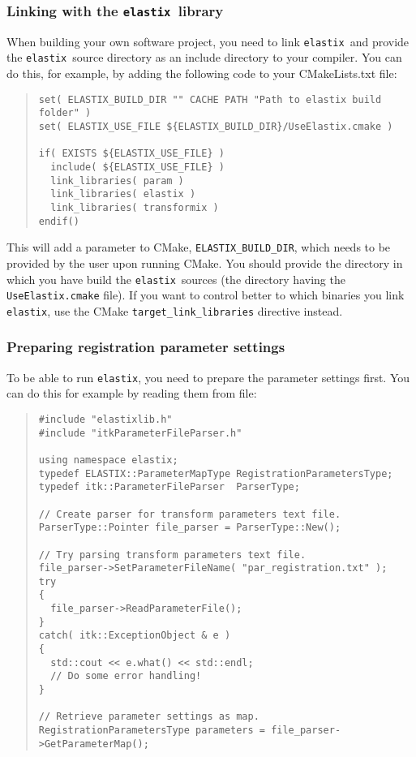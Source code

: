 \documentclass[]{report}
\newcommand{\elastix}{\texttt{elastix}}
\begin{document}
\subsubsection{Linking with the \elastix\ library}

When building your own software project, you need to link \elastix\
and provide the \elastix\ source directory as an include directory
to your compiler. You can do this, for example, by adding the
following code to your CMakeLists.txt file:
\begin{quote}
\begin{verbatim}
set( ELASTIX_BUILD_DIR "" CACHE PATH "Path to elastix build folder" )
set( ELASTIX_USE_FILE ${ELASTIX_BUILD_DIR}/UseElastix.cmake )

if( EXISTS ${ELASTIX_USE_FILE} )
  include( ${ELASTIX_USE_FILE} )
  link_libraries( param )
  link_libraries( elastix )
  link_libraries( transformix )
endif()
\end{verbatim}
\end{quote}

This will add a parameter to CMake, \texttt{ELASTIX\_BUILD\_DIR},
which needs to be provided by the user upon running CMake. You
should provide the directory in which you have build the \elastix\
sources (the directory having the \texttt{UseElastix.cmake} file).
If you want to control better to which binaries you link \elastix,
use the CMake \texttt{target\_link\_libraries} directive instead.


\subsubsection{Preparing registration parameter settings}

To be able to run \elastix, you need to prepare the parameter
settings first. You can do this for example by reading them from
file:
\begin{quote}
\begin{verbatim}
#include "elastixlib.h"
#include "itkParameterFileParser.h"

using namespace elastix;
typedef ELASTIX::ParameterMapType RegistrationParametersType;
typedef itk::ParameterFileParser  ParserType;

// Create parser for transform parameters text file.
ParserType::Pointer file_parser = ParserType::New();

// Try parsing transform parameters text file.
file_parser->SetParameterFileName( "par_registration.txt" );
try
{
  file_parser->ReadParameterFile();
}
catch( itk::ExceptionObject & e )
{
  std::cout << e.what() << std::endl;
  // Do some error handling!
}

// Retrieve parameter settings as map.
RegistrationParametersType parameters = file_parser->GetParameterMap();
\end{verbatim}
\end{quote}
\end{document}
